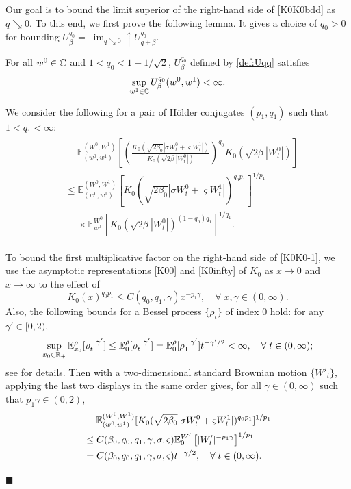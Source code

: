 \documentclass[12pt, twoside]{article}
\numberwithin{figure}{section}
\newcommand{\1}{\mathds 1}
\newcommand{\ua}{{\uparrow}}
\newcommand{\E}{{\mathbb E}}
\newcommand{\R}{{\Bbb R}}
\newcommand{\2}{{\mathbf 1}}
\renewenvironment{proof}[1][\proofname]{\noindent {\bfseries #1.}\;}{\hfill\ensuremath{\blacksquare}\\}
\newcommand{\two}{{\sqrt{2}}}
\begin{document}
Our goal is to bound the limit superior of the right-hand side of \eqref{K0K0bdd} as $q\searrow 0$. To this end, we first prove the following lemma. It gives a choice of $q_0>0$ for bounding $U^{q_0}_{\beta}=\lim_{q\searrow 0}\ua U^{q_0}_{q+\beta}$. 

\begin{lem}\label{lem:K0K0expbdd}
For all $w^0\in \Bbb C$ and $1<q_0<1+1/\two$, $U^{q_0}_\beta$ defined by \eqref{def:Uqq} satisfies  
\begin{align}\label{ineq:K0K0expbdd}
\sup_{w^1\in \Bbb C}U^{q_0}_\beta(w^0,w^1)<\infty.
\end{align}
\end{lem}
\begin{proof}
We consider the following for a pair of H\"older conjugates $(p_1,q_1)$ such that $1<q_1<\infty$:
\begin{align}
\begin{split}
&\quad\;\E^{(W^0,W^1)}_{(w^0,w^1)}\left[\left(\frac{K_0(\sqrt{2\beta_0}|\sigma W^0_t+\varsigma W_t^1|)}{K_0(\sqrt{2\beta}|W_t^0|)}\right)^{q_0}K_0(\sqrt{2\beta}
|W^0_t|)
\right]\\
&\leq \E^{(W^0,W^1)}_{(w^0,w^1)}[K_0(\sqrt{2\beta_0}|\sigma W^0_t+\varsigma W_t^1|)^{q_0p_1}
]^{1/p_1}\\
&\quad\;\times\E^{W^0}_{w^0}[K_0(\sqrt{2\beta}|W^0_t|)^{(1-q_0)q_1}]^{1/q_1}.\label{K0K0-1}
\end{split}
\end{align}

To bound the first multiplicative factor on the right-hand side of \eqref{K0K0-1}, we use the asymptotic representations \eqref{K00} and \eqref{K0infty} of $K_0$ as $x\to 0$ and $x\to\infty$ to the effect of 
\[
K_0(x)^{q_0p_1}\leq C(q_0,q_1,\gamma) x^{-p_1\gamma}, \quad \forall\;x,\gamma\in (0,\infty).
\]
Also, the following bounds for a Bessel process $\{\rho_t\}$ of index $0$ hold: for any $\gamma'\in [0,2)$, 
\[
\sup_{x_0\in \R_+}\E_{x_0}^\rho[\rho_t^{-\gamma'}]\leq \E_{0}^\rho[\rho_t^{-\gamma'}]= \E^{\rho}_0[\rho_1^{-\gamma'}]t^{-\gamma'/2}<\infty,\quad \forall\;t\in (0,\infty);
\]
see \cite[Lemma~6.2]{C:BES} for details. Then with a two-dimensional standard Brownian motion $\{W'_t\}$, applying the last two displays in the same order gives, for all $\gamma\in (0,\infty)$ such that $p_1\gamma\in (0,2)$,
\begin{align}
&\quad\;\E^{(W^0,W^1)}_{(w^0,w^1)}[K_0(\sqrt{2\beta_0}|\sigma W^0_t+\varsigma W_t^1|)^{q_0p_1}]^{1/p_1}\notag\\
&\leq C(\beta_0,q_0,q_1,\gamma,\sigma,\varsigma) \E^{W'}_{0}\left[|W'_t|^{-p_1\gamma}\right]^{1/p_1}\notag\\
&= C(\beta_0,q_0,q_1,\gamma,\sigma,\varsigma)t^{-\gamma/2},\quad \forall\;t\in (0,\infty).\label{expbdd:3}
\end{align}


\end{proof}
\end{document}
